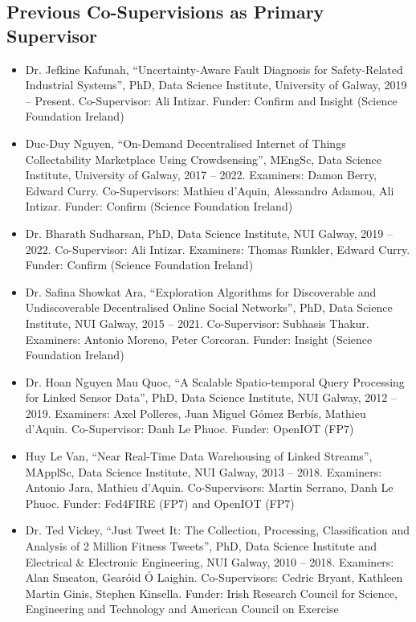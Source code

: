 \documentclass[10pt,a4paper]{res} %
\begin{document}
\begin{resume}
\subsection*{Previous Co-Supervisions as Primary Supervisor}

\begin{itemize} \itemsep -2pt
\item Dr. Jefkine Kafunah, ``Uncertainty-Aware Fault Diagnosis for Safety-Related Industrial Systems'', PhD, Data Science Institute, University of Galway, 2019 -- Present. Co-Supervisor: Ali Intizar. Funder: Confirm and Insight (Science Foundation Ireland) %
\item Duc-Duy Nguyen, ``On-Demand Decentralised Internet of Things Collectability Marketplace Using Crowdsensing'', MEngSc, Data Science Institute, University of Galway, 2017 -- 2022. Examiners: Damon Berry, Edward Curry. Co-Supervisors: Mathieu d'Aquin, Alessandro Adamou, Ali Intizar. Funder: Confirm (Science Foundation Ireland)
\item Dr. Bharath Sudharsan, PhD, Data Science Institute, NUI Galway, 2019 -- 2022. Co-Supervisor: Ali Intizar. Examiners: Thomas Runkler, Edward Curry. Funder: Confirm (Science Foundation Ireland) %
\item Dr. Safina Showkat Ara, ``Exploration Algorithms for Discoverable and Undiscoverable Decentralised Online Social Networks'', PhD, Data Science Institute, NUI Galway, 2015 -- 2021. Co-Supervisor: Subhasis Thakur. Examiners: Antonio Moreno, Peter Corcoran. Funder: Insight (Science Foundation Ireland) %
\item Dr. Hoan Nguyen Mau Quoc, ``A Scalable Spatio-temporal Query Processing for Linked Sensor Data'', PhD, Data Science Institute, NUI Galway, 2012 -- 2019. Examiners: Axel Polleres, Juan Miguel G\'{o}mez Berb\'{i}s, Mathieu d'Aquin. Co-Supervisor: Danh Le Phuoc. Funder: OpenIOT (FP7) %
\item Huy Le Van, ``Near Real-Time Data Warehousing of Linked Streams'', MApplSc, Data Science Institute, NUI Galway, 2013 -- 2018. Examiners: Antonio Jara, Mathieu d'Aquin. Co-Supervisors: Martin Serrano, Danh Le Phuoc. Funder: Fed4FIRE (FP7) and OpenIOT (FP7)
\item Dr. Ted Vickey, ``Just Tweet It: The Collection, Processing, Classification and Analysis of 2 Million Fitness Tweets'', PhD, Data Science Institute and Electrical \& Electronic Engineering, NUI Galway, 2010 -- 2018. Examiners: Alan Smeaton, Gear\'{o}id \'{O} Laighin. Co-Supervisors: Cedric Bryant, Kathleen Martin Ginis, Stephen Kinsella. Funder: Irish Research Council for Science, Engineering and Technology and American Council on Exercise %

\end{itemize}
\end{resume}
\end{document}
